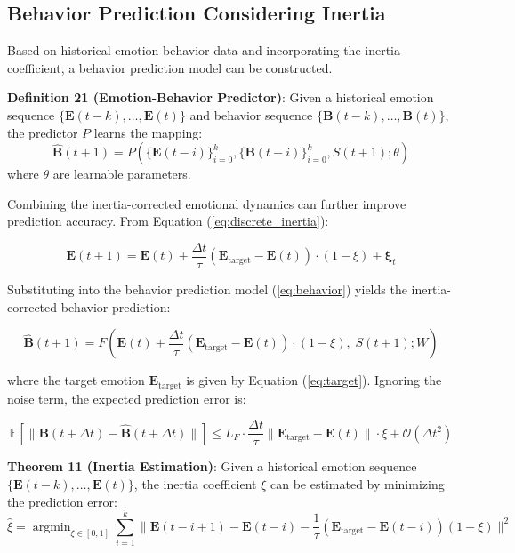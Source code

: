 \documentclass[12pt,a4paper]{article}
\theoremstyle{plain}
\newcommand{\ve}[1]{\bm{#1}}                    %
\newcommand{\Evec}{\ve{E}}                        %
\newcommand{\Bvec}{\ve{B}}                        %
\DeclareMathOperator*{\argmin}{argmin}
\begin{document}
\subsection{Behavior Prediction Considering Inertia}

Based on historical emotion-behavior data and incorporating the inertia coefficient, a behavior prediction model can be constructed.

\textbf{Definition 21 (Emotion-Behavior Predictor)}: Given a historical emotion sequence $\{\Evec(t-k), \dots, \Evec(t)\}$ and behavior sequence $\{\Bvec(t-k), \dots, \Bvec(t)\}$, the predictor $P$ learns the mapping:
\begin{equation}
\hat{\Bvec}(t+1) = P\left( \{\Evec(t-i)\}_{i=0}^{k}, \{\Bvec(t-i)\}_{i=0}^{k}, S(t+1); \theta \right)
\label{eq:predictor2}
\end{equation}
where $\theta$ are learnable parameters.

Combining the inertia-corrected emotional dynamics can further improve prediction accuracy. From Equation (\ref{eq:discrete_inertia}):

\begin{equation}
\Evec(t+1) = \Evec(t) + \frac{\Delta t}{\tau} (\Evec_{\text{target}} - \Evec(t)) \cdot (1 - \xi) + \boldsymbol{\xi}_t
\label{eq:inertia_prediction2}
\end{equation}

Substituting into the behavior prediction model (\ref{eq:behavior}) yields the inertia-corrected behavior prediction:

\begin{equation}
\hat{\Bvec}(t+1) = F\left( \Evec(t) + \frac{\Delta t}{\tau} (\Evec_{\text{target}} - \Evec(t)) \cdot (1 - \xi), \; S(t+1); W \right)
\label{eq:inertia_behavior2}
\end{equation}

where the target emotion $\Evec_{\text{target}}$ is given by Equation (\ref{eq:target}). Ignoring the noise term, the expected prediction error is:

\begin{equation}
\mathbb{E}[\| \Bvec(t+\Delta t) - \hat{\Bvec}(t+\Delta t) \|] \leq L_F \cdot \frac{\Delta t}{\tau} \| \Evec_{\text{target}} - \Evec(t) \| \cdot \xi + \mathcal{O}(\Delta t^2)
\label{eq:prediction_error}
\end{equation}

\textbf{Theorem 11 (Inertia Estimation)}: Given a historical emotion sequence $\{\Evec(t-k), \dots, \Evec(t)\}$, the inertia coefficient $\xi$ can be estimated by minimizing the prediction error:
\begin{equation}
\hat{\xi} = \argmin_{\xi \in [0,1]} \sum_{i=1}^{k} \| \Evec(t-i+1) - \Evec(t-i) - \frac{1}{\tau}(\Evec_{\text{target}} - \Evec(t-i))(1-\xi) \|^2
\label{eq:xi_estimate}
\end{equation}
\end{document}
